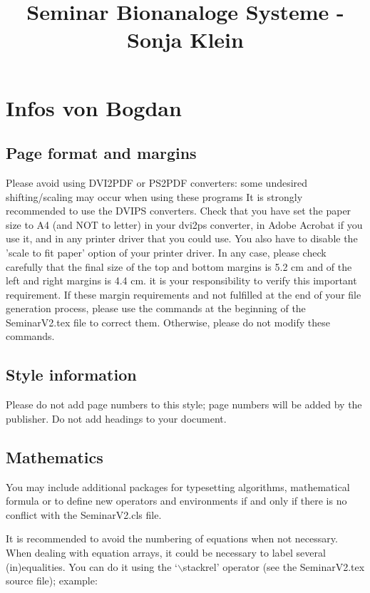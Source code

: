 \documentclass{SeminarV2}
\begin{document}
\title{Seminar Bionanaloge Systeme - Sonja Klein}
\maketitle







\section{Infos von Bogdan}
\subsection{Page format and margins}
Please avoid using DVI2PDF or PS2PDF converters: some undesired
shifting/scaling may occur when using these programs
It is strongly recommended to use the DVIPS converters. 
%
Check that you have set the paper size to A4 (and NOT to letter) in your
dvi2ps converter, in Adobe Acrobat if you use it, and in any printer driver
that you could use.  You also have to disable the 'scale to fit paper' option
of your printer driver.
%
In any case, please check carefully that the final size of the top and
bottom margins is 5.2 cm and of the left and right margins is 4.4 cm.
it is your responsibility to verify this important requirement.  If these margin requirements and not fulfilled at the end of your file generation process, please use the commands at the beginning of the SeminarV2.tex file to correct them.  Otherwise, please do not modify these commands.

\subsection{Style information}
Please do not add page numbers to this style; page numbers will be added by the publisher. Do not add headings to your document.
\subsection{Mathematics}
You may include additional packages for typesetting
algorithms, mathematical formula or to define new operators and environments
if and only if there is no conflict with the SeminarV2.cls
file.

It is recommended to avoid the numbering of equations when not
necessary. When dealing with equation arrays, it could be
necessary to label several (in)equalities. You can do it using the
`$\backslash$stackrel' operator (see the SeminarV2.tex source file);
example:
\end{document}
